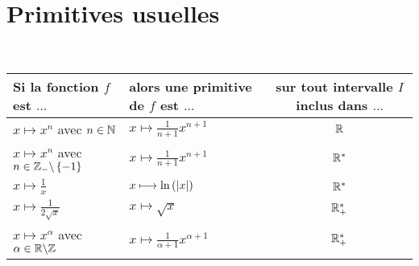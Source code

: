 \section{Primitives usuelles}
\begin{defprop}
    ~\\
    \renewcommand{\arraystretch}{2.75}
	\begin{tabular}{|l|l|c|}

		\hline
		Si la fonction \(f\) est \(\dots\) & alors une primitive de \(f\) est \(\dots\) & sur tout intervalle \(I\) inclus dans \(\dots\)\\
        \hline
        \(x\mapsto x^n\) avec \(n \in \mathbb{N}\) & \(x\mapsto \frac{1}{n+1} x^{n+1}\) & \(\mathbb{R}\) \\
        \(x\mapsto x^n\) avec \(n \in \mathbb{Z}_- \backslash\left\lbrace-1\right\rbrace\) & \(x\mapsto \frac{1}{n+1} x^{n+1}\) & \(\mathbb{R}^*\) \\
        \(x\mapsto \frac{1}{x}\) & \(x\longmapsto \ln\left(\left\lvert x\right\rvert\right)\) & \(\mathbb{R}^*\) \\
        \(x\mapsto \frac{1}{2\sqrt{x}}\) & \(x\mapsto \sqrt{x}\) & \(\mathbb{R}_+^*\) \\
        \(x\mapsto x^{\alpha}\) avec \(\alpha \in \mathbb{R} \backslash\mathbb{Z}\)& \(x\mapsto \frac{1}{\alpha + 1}x^{\alpha+1}\) & \(\mathbb{R}_+^*\) \\

        \hline
	\end{tabular}
\end{defprop}

